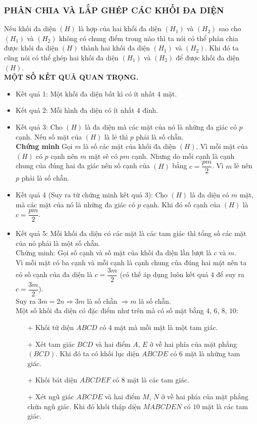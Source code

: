 \subsubsection{PHÂN CHIA VÀ LẮP GHÉP CÁC KHỐI ĐA DIỆN}
Nếu khối đa diện $(H)$ là hợp của hai khối đa diện $(H_1)$ và $(H_2)$ sao cho $(H_1)$ và $(H_2)$ không có chung điểm trong nào thì ta nói có thể phân chia được khối đa diện $(H)$ thành hai khối đa diện $(H_1)$ và $(H_2)$. Khi đó ta cũng nói có thể ghép hai khối đa diện $(H_1)$ và $(H_2)$ để được khối đa diện $(H)$.\\
\textbf{MỘT SỐ KẾT QUẢ QUAN TRỌNG.}
\begin{itemize}
	\item Kết quả 1: Một khối đa diện bất kì có ít nhất $4$ mặt.
	\item Kết quả 2: Mỗi hình đa diện có ít nhất $4$ đỉnh.
	\item Kết quả 3: Cho $(H)$ là đa diện mà các mặt của nó là những đa giác có $p$ cạnh. Nếu số mặt của $(H)$ là lẻ thì $p$ phải là số chẵn.\\
	\textbf{Chứng minh}
	Gọi $m$ là số các mặt của khối đa diện $(H)$. Vì mỗi mặt của $(H)$ có $p$ cạnh nên $m$ mặt sẽ có $pm$ cạnh. Nhưng do mỗi cạnh là cạnh chung của đúng hai đa giác nên số cạnh của $(H)$ bằng $c=\dfrac{pm}{2}$. Vì $m$ lẻ nên $p$ phải là số chẵn.
	\item Kết quả 4 (Suy ra từ chứng minh kết quả 3): Cho $(H)$ là đa diện có $m$ mặt, mà các mặt của nó là những đa giác có $p$ cạnh. Khi đó số cạnh của $(H)$ là $c=\dfrac{pm}{2}$.
	\item Kết quả 5: Mỗi khối đa diện có các mặt là các tam giác thì tổng số các mặt của nó phải là một số chẵn.\\
	Chứng minh: Gọi số cạnh và số mặt của khối đa diện lần lượt là $c$ và $m$.\\
	Vì mỗi mặt có ba cạnh và mỗi cạnh là cạnh chung của đúng hai mặt nên ta có số cạnh của đa diện là $c=\dfrac{3m}{2}$ (có thế áp dụng luôn kết quả 4 để suy ra $c=\dfrac{3m}{2}$).\\
	Suy ra $3m=2n\Rightarrow 3m$ là số chẵn $\Rightarrow m$ là số chẵn.\\
	Một số khối đa diện có đặc điểm như trên mà có số mặt bằng $4$, $6$, $8$, $10$:
	\begin{itemize}
		\item[+] Khối tứ diện $ABCD$ có $4$ mặt mà mỗi mặt là một tam giác.
		\item[+] Xét tam giác $BCD$ và hai điểm $A$, $E$ ở về hai phía của mặt phẳng $(BCD)$. Khi đó ta có khối lục diện $ABCDE$ có $6$ mặt là những tam giác.
		\item[+] Khối bát diện $ABCDEF$ có $8$ mặt là các tam giác.
		\item[+] Xét ngũ giác $ABCDE$ và hai điểm $M$, $N$ ở về hai phía của mặt phẳng chứa ngũ giác. Khi đó khối thập diện $MABCDEN$ có $10$ mặt là các tam giác.
		

\end{itemize}
\end{itemize}
